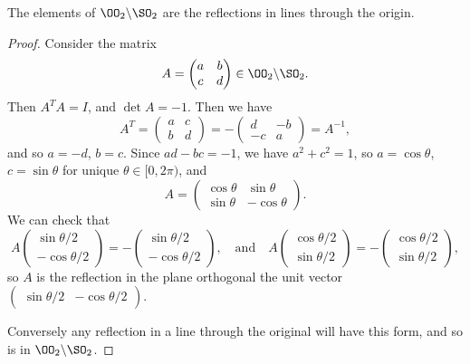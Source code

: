 \documentclass[a4paper]{scrartcl}
\begin{document}
\begin{theorem}
	The elements of $\OO_2 \backslash \SO_2$ are the reflections in lines through the origin.
\end{theorem}
\begin{proof}
	Consider the matrix
	$$
A = \begin{pmatrix}
	a & b \\ c & d
\end{pmatrix} \in \OO_2 \backslash \SO_2.
	$$
	Then $A^T A = I$, and $\det A = -1$. Then we have
	$$
A^T = \begin{pmatrix}
	a & c \\ b & d
\end{pmatrix} = - \begin{pmatrix}
	d & -b \\-c & a
\end{pmatrix} = A^{-1},
	$$
and so $a = -d$, $b = c$. Since $ad - bc = -1$, we have $a^2 + c^2 = 1$, so $a = \cos \theta$, $c = \sin \theta$ for unique $\theta \in [0, 2\pi)$, and
$$
A = \begin{pmatrix}
	\cos \theta & \sin \theta \\
	\sin \theta & - \cos \theta
\end{pmatrix}.
$$
We can check that
$$
A\begin{pmatrix}
	\sin \theta/2 \\
	-\cos \theta/2
\end{pmatrix} = - \begin{pmatrix}
	\sin \theta/2 \\
	-\cos \theta/2
\end{pmatrix},
\quad \text{and}\quad
A\begin{pmatrix}
	\cos \theta/2 \\
	\sin \theta/2
\end{pmatrix} = - \begin{pmatrix}
	\cos \theta/2 \\
	\sin \theta/2
\end{pmatrix},
$$
so $A$ is the reflection in the plane orthogonal the unit vector $\begin{pmatrix}
	\sin \theta/2 & -\cos \theta/2
\end{pmatrix}$. 

Conversely any reflection in a line through the original will have this form, and so is in $\OO_2 \backslash \SO_2$.
\end{proof}
\end{document}

